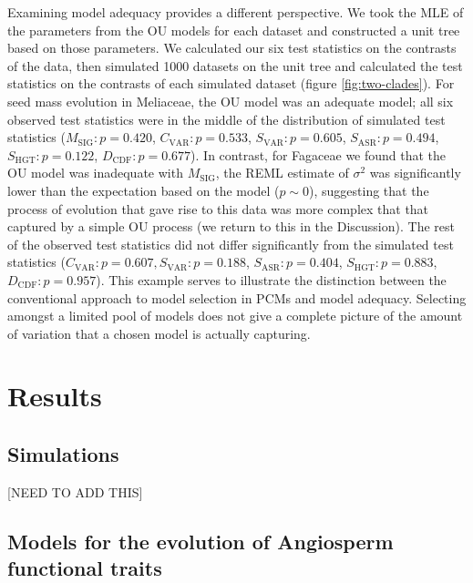 \documentclass[a4paper,11pt]{article}
\begin{document}
Examining model adequacy provides a different perspective. We took the MLE of the parameters from the OU models for each dataset and constructed a unit tree based on those parameters. We calculated our six test statistics on the contrasts of the data, then simulated 1000 datasets on the unit tree and calculated the test statistics on the contrasts of each simulated dataset (figure \ref{fig:two-clades}). For seed mass evolution in Meliaceae, the OU model was an adequate model; all six observed test statistics were in the middle of the distribution of simulated test statistics ($M_{\text{SIG}}: p=0.420$, $C_{\text{VAR}}: p=0.533$, $S_{\text{VAR}}: p=0.605$, $S_{\text{ASR}}:p=0.494$, $S_{\text{HGT}}: p=0.122$, $D_{\text{CDF}}: p=0.677$). In contrast, for Fagaceae we found that the OU model was inadequate with $M_{\text{SIG}}$, the REML estimate of $\sigma^2$ was significantly lower than the expectation based on the model ($p\sim 0$), suggesting that the process of evolution that gave rise to this data was more complex that that captured by a simple OU process (we return to this in the Discussion).  The rest of the observed test statistics did not differ significantly from the simulated test statistics ($C_{\text{VAR}}:p=0.607, S_{\text{VAR}}: p=0.188$, $S_{\text{ASR}}:p=0.404$, $S_{\text{HGT}}: p=0.883$, $D_{\text{CDF}}: p=0.957$). This example serves to illustrate the distinction between the conventional approach to model selection in PCMs and model adequacy. Selecting amongst a limited pool of models does not give a complete picture of the amount of variation that a chosen model is actually capturing.


\section{Results}

\subsection{Simulations}

[NEED TO ADD THIS]

\subsection{Models for the evolution of Angiosperm functional traits}
\end{document}
